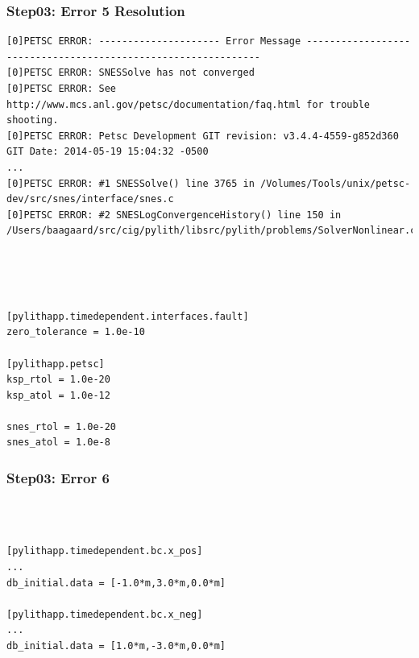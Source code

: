 \documentclass{beamer}
\begin{document}
\begin{frame}[fragile]
  \frametitle{Step03: Error 5 Resolution}

\begin{lstlisting}
[0]PETSC ERROR: --------------------- Error Message --------------------------------------------------------------
[0]PETSC ERROR: SNESSolve has not converged
[0]PETSC ERROR: See http://www.mcs.anl.gov/petsc/documentation/faq.html for trouble shooting.
[0]PETSC ERROR: Petsc Development GIT revision: v3.4.4-4559-g852d360  GIT Date: 2014-05-19 15:04:32 -0500
...
[0]PETSC ERROR: #1 SNESSolve() line 3765 in /Volumes/Tools/unix/petsc-dev/src/snes/interface/snes.c
[0]PETSC ERROR: #2 SNESLogConvergenceHistory() line 150 in /Users/baagaard/src/cig/pylith/libsrc/pylith/problems/SolverNonlinear.cc
\end{lstlisting}\pause
{} \\
\\
\pause\\
\begin{lstlisting}
[pylithapp.timedependent.interfaces.fault]
zero_tolerance = 1.0e-10

[pylithapp.petsc]
ksp_rtol = 1.0e-20
ksp_atol = 1.0e-12

snes_rtol = 1.0e-20
snes_atol = 1.0e-8
\end{lstlisting}

\end{frame}


\begin{frame}[fragile]
  \frametitle{Step03: Error 6}

 \pause\\
\pause\\
\begin{lstlisting}
[pylithapp.timedependent.bc.x_pos]
...
db_initial.data = [-1.0*m,3.0*m,0.0*m]

[pylithapp.timedependent.bc.x_neg]
...
db_initial.data = [1.0*m,-3.0*m,0.0*m]
\end{lstlisting}

\end{frame}
\end{document}
